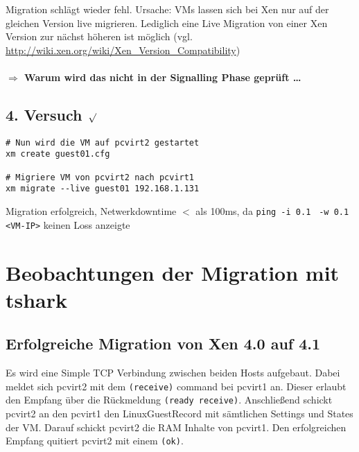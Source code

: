 Migration schlägt wieder fehl. Ursache: VMs lassen sich bei Xen nur auf der gleichen Version live migrieren. Lediglich eine Live Migration von einer Xen Version zur nächst höheren ist möglich (vgl. \url{http://wiki.xen.org/wiki/Xen_Version_Compatibility})
\\
\\
\Large{\textbf{$\Rightarrow$ Warum wird das nicht in der Signalling Phase geprüft  \dots}}

\subsection {4. Versuch $\surd$ }
\setupVerbatimOut
\begin{verbatim}
# Nun wird die VM auf pcvirt2 gestartet 
xm create guest01.cfg

# Migriere VM von pcvirt2 nach pcvirt1
xm migrate --live guest01 192.168.1.131
\end{verbatim}

Migration erfolgreich, Netwerkdowntime $<$ als 100ms, da \verb|ping -i 0.1| \verb| -w 0.1 <VM-IP>| keinen Loss anzeigte

\section{Beobachtungen der Migration mit tshark}

\subsection{Erfolgreiche Migration von Xen 4.0 auf 4.1}

Es wird eine Simple TCP Verbindung zwischen beiden Hosts aufgebaut. Dabei meldet sich pcvirt2 mit dem \verb|(receive)| command bei pcvirt1 an. Dieser erlaubt den Empfang über die Rückmeldung \verb|(ready receive)|. Anschließend schickt pcvirt2 an den pcvirt1 den LinuxGuestRecord mit sämtlichen Settings und States der VM. Darauf schickt pcvirt2 die RAM Inhalte von pcvirt1. Den erfolgreichen Empfang quitiert pcvirt2 mit einem \verb|(ok)|.

